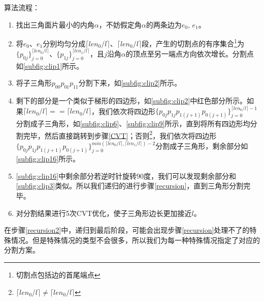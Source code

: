 算法流程：
\begin{enumerate}
    \item 找出三角面片最小的内角$\alpha$，不妨假定角$\alpha$的两条边为$e_0$, $e_1$。
    \item 将$e_0$、$e_1$分别均匀分成$\lceil len_0/l \rceil$、$\lceil len_0/l \rceil$段，产生的切割点的有序集合\footnote{切割点包括边的首尾端点}为$\{p_{0j}\}^{\lceil len_0/l \rceil}_{j=0}$、$\{p_{1j}\}^{\lceil len_1/l \rceil}_{j=0}$，且$j$沿角$\alpha$的顶点至另一端点方向依次增长。分割点如\autoref{subfig:clip1}所示。
    \item 将子三角形$p_{00}p_{01}p_{11}$分割下来，如\autoref{subfig:clip2}所示。
    \item 剩下的部分是一个类似于梯形的四边形，如\autoref{subfig:clip2}中红色部分所示。如果$\lceil len_0/l \rceil == \lceil len_0/l \rceil$，我们依次将四边形$\{p_{0j}p_{1j}p_{1(j+1)}p_{0(j+1)}\}^{\lceil len_0/l \rceil - 1}_{j=0}$分割成子三角形，如\autoref{subfig:clip6}、\autoref{subfig:clip9}所示，直到将所有四边形均分割完毕，然后直接跳转到步骤\ref{CVT}；否则\footnote{$\lceil len_0/l \rceil \ne \lceil len_0/l \rceil$}，我们依次将四边形$\{p_{0j}p_{1j}p_{1(j+1)}p_{0(j+1)}\}^{min(\lceil len_0/l \rceil, \lceil len_1/l \rceil) - 2}_{j=0}$分割成子三角形，剩余部分如\autoref{subfig:clip16}所示。\label{recursion}
    \item \autoref{subfig:clip16}中剩余部分若逆时针旋转90度，我们可以发现剩余部分和\autoref{subfig:clip3}类似。所以我们递归的进行步骤\ref{recursion}，直到三角形分割完毕。\label{recursion2}
    \item 对分割结果进行5次CVT优化，使子三角形边长更加接近$l$。\label{CVT}
\end{enumerate}

在步骤\ref{recursion2}中，递归到最后阶段，可能会出现步骤\ref{recursion}处理不了的特殊情况。但是特殊情况的类型不会很多，所以我们为每一种特殊情况指定了对应的分割方案。

